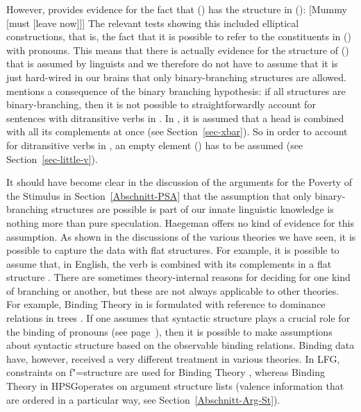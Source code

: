 \noindent
However, \citet[]{Haegeman94a-u} provides evidence for the fact that () has the structure in ():
\ea
{}[Mummy [must [leave now]]]
\z
The relevant tests showing this included elliptical constructions, that is, the fact that it is possible to
refer to the constituents in () with pronouns. This means that there is actually evidence for
the structure of () that is assumed by linguists and we therefore do not have to assume that
it is just hard-wired in our brains that only binary-branching structures are allowed. \citet[]{Haegeman94a-u} mentions a consequence of the binary branching hypothesis: if all structures are
binary-branching, then it is not possible to straightforwardly account for sentences with
ditransitive verbs in \xbart. In \xbart, it is assumed that a head is combined with all its
complements at once (see Section~\ref{sec-xbar}). So in order to account for ditransitive verbs in
\xbart, an empty element (\littlev) has to be assumed (see Section~\ref{sec-little-v}).

It should have become clear in the discussion of the arguments for the Poverty of the Stimulus in Section~\ref{Abschnitt-PSA} that
the assumption that only binary-branching structures are possible is part of our innate linguistic knowledge is nothing more than pure
speculation. Haegeman offers no kind of evidence for this assumption. As shown in the discussions of the various theories we have seen,  
it is possible to capture the data with flat structures. For example, it is possible to assume that, in English, the verb
is combined with its complements in a flat structure \citep[]{ps2}. There are sometimes theory-internal reasons for
deciding for one kind of branching or another, but these are not always applicable to other theories. For example, Binding Theory
in \gbt is formulated with reference to dominance relations in trees \citep[]{Chomsky81a}. If one assumes that syntactic structure plays
a crucial role for the binding of pronouns (see page~\pageref{Seite-Bindungstheorie}), then it is possible to make assumptions about syntactic
structure based on the observable binding relations. Binding data have, however, received a very different treatment in various theories.
In LFG\indexlfg, constraints on f"=structure are used for Binding Theory \citep{Dalrymple93a}, whereas Binding Theory
in HPSG\indexhpsg operates on argument structure lists (valence information that are ordered in a particular way,
see Section~\ref{Abschnitt-Arg-St}).
 
